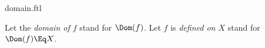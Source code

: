 \documentclass{stex}
\begin{document}
\begin{smodule}{domain.ftl}



\begin{convention*}
  Let the \emph{domain of $f$} stand for $\Dom(f)$.
  Let $f$ is \emph{defined on $X$} stand for $\Dom(f) \Eq X$.
\end{convention*}

\end{smodule}
\end{document}
